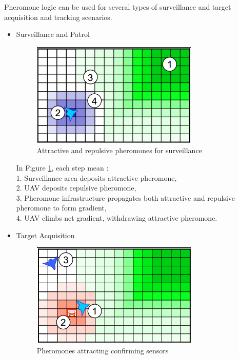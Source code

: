 Pheromone logic  can  be  used  for  several  types  of  surveillance  and target  acquisition  and  tracking scenarios.\\

\begin{itemize}
\item Surveillance and Patrol

\begin{figure}[h]
\center
\includegraphics[scale=0.7]{../images/pheromone_surveillance.png}
\caption{\label{surveillance}Attractive and repulsive pheromones for surveillance\cite{PerformanceOfDigitalPheromones10}}
\end{figure}

In Figure \ref{surveillance}, each step mean :\\
 1. Surveillance area deposits attractive pheromone,\\
 2. UAV deposits repulsive pheromone,\\ 
 3. Pheromone infrastructure propagates both attractive and repulsive pheromone to form gradient,\\
 4. UAV climbs net gradient, withdrawing attractive pheromone.
 
\item Target Acquisition

\begin{figure}[h]
\center
\includegraphics[scale=0.7]{../images/pheromone_target_acquisition.png}
\caption{\label{targetacquisition}Pheromones attracting confirming sensors\cite{PerformanceOfDigitalPheromones10}}
\end{figure}


\end{itemize}
